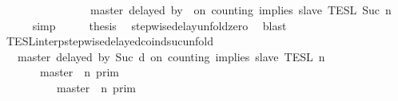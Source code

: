 \begin{isabellebody}
\ \ \ \ \ \ \ \ \ \ \ \ \ \ {\isasyminter}\ {\isasymlbrakk}\ master\ delayed\ by\ {}\ on\ counting\ implies\ slave\ {\isasymrbrakk}\isactrlsub T\isactrlsub E\isactrlsub S\isactrlsub L\isactrlbsup {\isasymge}\ Suc\ n\isactrlesup {\isacartoucheclose}\isanewline
\ \ \ \ \isamarkupfalse%
\ simp\isanewline
\ \ \isamarkupfalse%
\ \isamarkupfalse%
\ {\isacharquery}thesis\ \isamarkupfalse%
\ stepwise{\isacharunderscore}delay{\isacharunderscore}unfold{\isacharunderscore}zero\ \isamarkupfalse%
\ blast\isanewline
{}\isamarkupfalse%
%
\endisatagproof
{\isafoldproof}%
%
\isadelimproof
\isanewline
%
\endisadelimproof
\isanewline
{}\isamarkupfalse%
\ TESL{\isacharunderscore}interp{\isacharunderscore}stepwise{\isacharunderscore}delayed{\isacharunderscore}coind{\isacharunderscore}suc{\isacharunderscore}unfold{\isacharcolon}\isanewline
\ \ {\isacartoucheopen}{\isasymlbrakk}\ master\ delayed\ by\ {\isacharparenleft}Suc\ d{\isacharparenright}\ on\ counting\ implies\ slave\ {\isasymrbrakk}\isactrlsub T\isactrlsub E\isactrlsub S\isactrlsub L\isactrlbsup {\isasymge}\ n\isactrlesup \ {\isacharequal}\isanewline
\ \ \ \ \ {\isacharparenleft}\ {\isasymlbrakk}\ master\ {\isasymnot}{\isasymUp}\ n\ {\isasymrbrakk}\isactrlsub p\isactrlsub r\isactrlsub i\isactrlsub m\ \ \ \ \ \ \ \ \ \ \ \ \ \ \ \ \ \ \ %
\isanewline
\ \ \ \ \ \ \ \ {\isasymunion}\ {\isacharparenleft}{\isasymlbrakk}\ master\ {\isasymUp}\ n\ {\isasymrbrakk}\isactrlsub p\isactrlsub r\isactrlsub i\isactrlsub m\ \ \ \ \ \ \ \ \ \ \ \ \ \ \ \ %

\end{isabellebody}
